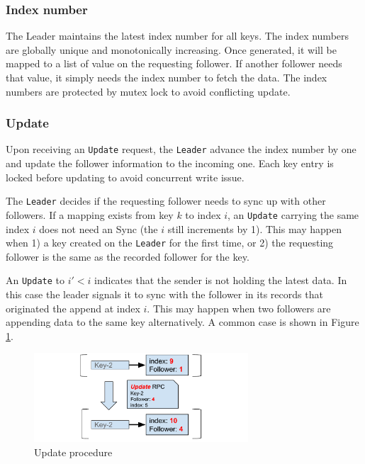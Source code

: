\documentclass[11pt,english,twocolumn]{article}
\begin{document}
\subsubsection{Index number}
The Leader maintains the latest index number for all keys. The index numbers are globally unique and monotonically increasing. Once generated, it will be mapped to a list of value on the requesting follower. If another follower needs that value, it simply needs the index number to fetch the data. The index numbers are protected by mutex lock to avoid conflicting update. 

 \vspace{-0.4cm}
\subsubsection{Update}
Upon receiving an \texttt{Update} request, the \texttt{Leader} advance the index number by one and update the follower information to the incoming one. Each key entry is locked before updating to avoid concurrent write issue.

The \texttt{Leader} decides if the requesting follower needs to sync up with other followers. If a mapping exists from key $k$ to index $i$, an \texttt{Update} carrying the same index $i$ does not need an Sync (the $i$ still increments by 1). This may happen when 1)  a key created on the \texttt{Leader} for the first time, or 2) the requesting follower is the same as the recorded follower for the key.

An \texttt{Update} to $i' < i$ indicates that the sender is not holding the latest data. In this case the leader signals it to sync with the follower in its records that originated the append at index $i$. This may happen when two followers are appending data to the same key alternatively. A common case is shown in Figure \ref{CommonUpdate}.

\begin{figure}[h]
\includegraphics[width=8cm]{figure/update.pdf}
\caption{Update procedure}
\label{CommonUpdate}
\end{figure}

\vspace{-0.3cm}
\end{document}
